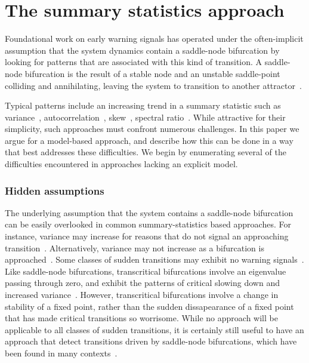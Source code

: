 \documentclass[authoryear,review,11pt]{elsarticle}
\begin{document}
\section{The summary statistics approach}
Foundational work on early warning signals has operated under the often-implicit assumption
that the system dynamics contain a saddle-node bifurcation by
looking for patterns that are associated with this kind of transition.
A saddle-node bifurcation is the result of a stable node and an unstable
saddle-point colliding and annihilating, leaving the system to transition 
to another attractor~\citep[see ][or other dynamical systems text 
for an introduction to this and other bifurcations]{Guckenheimer1983}.   

Typical patterns include an increasing trend in a summary statistic such as
variance~\citep{Carpenter2006}, autocorrelation~\citep{Held2004, Dakos2008},
skew~\citep{Guttal2008}, spectral ratio~\citep{Biggs2009}.
While attractive for their simplicity, such approaches must confront numerous challenges.
In this paper we argue for a model-based approach,
and describe how this can be done in a way that best addresses these difficulties.
We begin by enumerating several of the difficulties encountered in approaches lacking an explicit model.



\subsubsection*{Hidden assumptions}
The underlying assumption that the system contains a saddle-node bifurcation
can be easily overlooked in common summary-statistics based approaches.
For instance, variance may increase for reasons that
do not signal an approaching transition~\citep{Schreiber2003, Schreiber2008}.
Alternatively, variance may not increase as a bifurcation is approached~\citep{Livina2012, Dakos2011a}.
Some classes of sudden transitions may exhibit no warning signals~\cite{Hastings2010}.
Like saddle-node bifurcations, transcritical bifurcations involve an eigenvalue passing through zero,
and exhibit the patterns of critical slowing down and increased variance~\citep{Drake2010}.  
However, transcritical bifurcations involve a change in stability of a fixed point, rather
than the sudden dissapearance of a fixed point that has made critical transitions so worrisome.%
While no approach will be applicable to all classes of sudden transitions,
it is certainly still useful to have an approach that detect transitions driven by
saddle-node bifurcations, which have been found in many contexts~\citep[\emph{e.g.}, see][]{Scheffer2001}.
\end{document}
